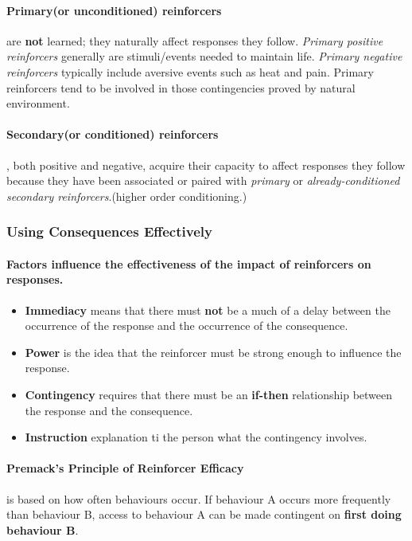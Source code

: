 \documentclass{article}
\begin{document}
	\paragraph{Primary(or unconditioned) reinforcers} are \textbf{not} learned; they naturally affect responses they follow. \emph{Primary positive reinforcers} generally are stimuli/events needed to maintain life. \emph{Primary negative reinforcers} typically include aversive events such as heat and pain. Primary reinforcers tend to be involved in those contingencies proved by natural environment.
	
	\paragraph{Secondary(or conditioned) reinforcers}, both positive and negative, acquire their capacity to affect responses they follow because they have been associated or paired with \emph{primary} or \emph{already-conditioned secondary reinforcers}.(higher order conditioning.)
	
	\subsubsection{Using Consequences Effectively}
	\paragraph{Factors influence the effectiveness of the impact of reinforcers on responses.}
	\begin{itemize}
		\item \textbf{Immediacy} means that there must \textbf{not} be a much of a delay between the occurrence of the response and the occurrence of the consequence.
		\item \textbf{Power} is the idea that the reinforcer must be strong enough to influence the response.
		\item \textbf{Contingency} requires that there must be an \textbf{if-then} relationship between the response and the consequence.
		\item \textbf{Instruction} explanation ti the person what the contingency involves.
	\end{itemize}
	\paragraph{Premack's Principle of Reinforcer Efficacy} is based on how often behaviours occur. If behaviour A occurs more frequently than behaviour B, access to behaviour A can be made contingent on \textbf{first doing behaviour B}.
\end{document}
